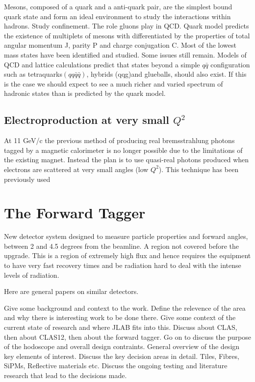 Mesons, composed of a quark and a anti-quark pair, are the simplest bound quark state and form an ideal environment to study the interactions within hadrons. 
Study confinement.
The role gluons play in QCD.
Quark model predicts the existence of multiplets of mesons with differentiated by the properties of total angular momentum J, parity P and charge conjugation C.
Most of the lowest mass states have been identified and studied.
Some issues still remain.
Models of QCD and lattice calculations predict that states beyond a simple $q\bar{q}$ configuration such as tetraquarks$(qq\bar{q}\bar{q})$, hybrids (qqg)and glueballs, should also exist.
If this is the case we should expect to see a much richer and varied spectrum of hadronic states than is predicted by the quark model.

\subsection{Electroproduction at very small $Q^2$}
At 11 GeV/c the previous method of producing real bremsstrahlung photons tagged by a magnetic calorimeter is no longer possible due to the limitations of the existing magnet. Instead the plan is to use quasi-real photons produced when electrons are scattered at very small angles (low $Q^2$). This technique has been previously used 

 
\section{The Forward Tagger}
New detector system designed to measure particle properties and forward angles, between 2 and 4.5 degrees from the beamline. A region not covered before the upgrade. This is a region of extremely high flux and hence requires the equipment to have very fast recovery times and be radiation hard to deal with the intense levels of radiation.

Here are general papers on similar detectors.
\cite{reiche2001studies}
\cite{wojcik1994embedded}
\cite{cohn1993scintillating}
\cite{budd2001cms}
\cite{artikov2006new}
\cite{albrow1987uranium}
\cite{barsuk2000fiber}
\cite{adloff2010construction}

Give some background and context to the work.
Define the relevence of the area and why there is interesting work to be done there.
Give some context of the current state of research and where JLAB fits into this.
Discuss about CLAS, then about CLAS12, then about the forward tagger.
Go on to discuss the purpose of the hodoscope and overall design contraints.
General overview of the design key elements of interest.
Discuss the key decision areas in detail. Tiles, Fibres, SiPMs, Reflective materials etc.
Discuss the ongoing testing and literature research that lead to the decisions made.


